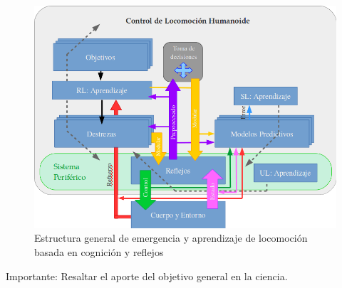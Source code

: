 \begin{figure}[!htb]
  \centering
  \includegraphics[width=1.0\textwidth]{images/ObjetivoGeneral.png}
  \caption{Estructura general de emergencia y aprendizaje de locomoci\'on basada en cognici\'on y reflejos}
  \label{fig:ObjGen}
\end{figure}

Importante: Resaltar el aporte del objetivo general en la ciencia.



